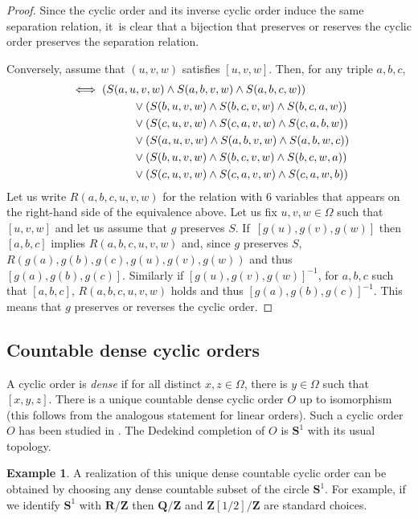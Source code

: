 \documentclass[JEP,XML,SOM,Unicode,NoFloatCountersInSection,published]{cedram}
\theoremstyle{plain}
\theoremstyle{definition}
\newtheorem{example}[theorem]{Example}
\theoremstyle{remark}
\begin{document}
\begin{proof}
Since the cyclic order and its inverse cyclic order induce the same separation relation, it~is clear that a bijection that preserves or reserves the cyclic order preserves the separation relation.

Conversely, assume that $(u,v,w)$ satisfies $[u,v,w]$.
Then, for any triple $a,b,c$,
\begin{align*}
[a,b,c]&\iff (S(a,u,v,w)\wedge S(a,b,v,w)\wedge S(a,b,c,w))\\
&\hspace*{2cm}\vee(S(b,u,v,w)\wedge S(b,c,v,w)\wedge S(b,c,a,w))\\
&\hspace*{2cm}\vee(S(c,u,v,w)\wedge S(c,a,v,w)\wedge S(c,a,b,w))\\
&\hspace*{2cm}\vee(S(a,u,v,w)\wedge S(a,b,v,w)\wedge S(a,b,w,c))\\
&\hspace*{2cm}\vee(S(b,u,v,w)\wedge S(b,c,v,w)\wedge S(b,c,w,a))\\
&\hspace*{2cm}\vee(S(c,u,v,w)\wedge S(c,a,v,w)\wedge S(c,a,w,b))
\end{align*}
Let us write $R(a,b,c,u,v,w)$ for the relation with $6$ variables that appears on the right-hand side of the equivalence above.
Let us fix $u,v,w \in \Omega$ such that $[u,v,w]$ and let us assume that $g$ preserves $S$. If~$[g(u),g(v),g(w)]$ then $[a,b,c]$ implies $R(a,b,c,u,v,w)$ and, since $g$ preserves $S$, $R(g(a),g(b),g(c),g(u),g(v),g(w))$ and thus $[g(a),g(b),g(c)]$.
Similarly if $[g(u),g(v),g(w)]^{-1}$, for $a,b,c$ such that $[a,b,c]$, $R(a,b,c,u,v,w)$ holds and thus $[g(a),g(b),g(c)]^{-1}$.
This means that $g$ preserves or reverses the cyclic order.
\end{proof}

\subsection{Countable dense cyclic orders}

A cyclic order is \emph{dense} if for all distinct $x,z\in \Omega$, there is $y \in \Omega$ such that $[x,y,z]$.
There is a unique countable dense cyclic order $O$ up to isomorphism (this follows from the analogous statement for linear orders).
Such a cyclic order $O$ has been studied in \cite{Truss}.
The Dedekind completion of $O$ is $\mathbf{S}^1$ with its usual topology.

\begin{example}
A realization of this unique dense countable cyclic order can be obtained by choosing any dense countable subset of the circle $\mathbf{S}^1$.
For example, if we identify $\mathbf{S}^1$ with $\mathbf{R}/\mathbf{Z}$ then $\mathbf{Q}/\mathbf{Z}$ and $\mathbf{Z}[1/2]/\mathbf{Z}$ are standard choices.
\end{example}
\end{document}
